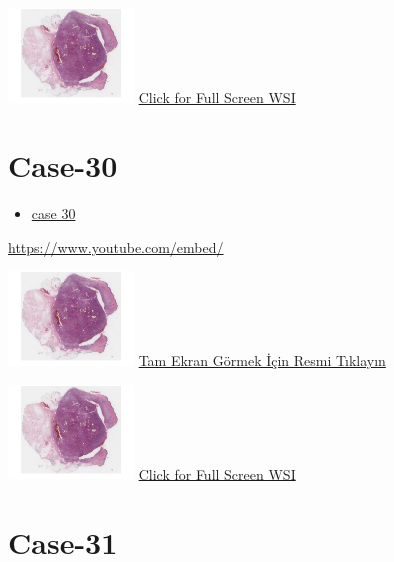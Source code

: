 \documentclass[
  letterpaper,
  paper=6in:9in,
  pagesize=pdftex,
  headinclude=on,
  footinclude=on,
  12pt]{scrbook}
\providecommand{\tightlist}{%
  \setlength{\itemsep}{0pt}\setlength{\parskip}{0pt}}\usepackage{longtable,booktabs,array}
\begin{document}
\href{https://images.patolojiatlasi.com/hacettepe-com-case-1/HE.html}{\includegraphics[width=0.25\textwidth,height=\textheight]{./screenshots/hacettepe-com-case-1_screenshot.png}}
\href{https://images.patolojiatlasi.com/hacettepe-com-case-/HE.html}{Click
for Full Screen WSI}

\hypertarget{sec-hacettepe-case-of-the-month-case-30}{%
\section{Case-30}\label{sec-hacettepe-case-of-the-month-case-30}}

\begin{itemize}
\tightlist
\item
  \href{https://www.youtube.com/watch?v=az6Fk7bYsQ8\&ab_channel=KemalKosemehmetoglu}{case
  30}
\end{itemize}

\url{https://www.youtube.com/embed/}

\href{https://images.patolojiatlasi.com/hacettepe-com-case-1/HE.html}{\includegraphics[width=0.25\textwidth,height=\textheight]{./screenshots/hacettepe-com-case-1_screenshot.png}}
\href{https://images.patolojiatlasi.com/hacettepe-com-case-/HE.html}{Tam
Ekran Görmek İçin Resmi Tıklayın}

\href{https://images.patolojiatlasi.com/hacettepe-com-case-1/HE.html}{\includegraphics[width=0.25\textwidth,height=\textheight]{./screenshots/hacettepe-com-case-1_screenshot.png}}
\href{https://images.patolojiatlasi.com/hacettepe-com-case-/HE.html}{Click
for Full Screen WSI}

\hypertarget{sec-hacettepe-case-of-the-month-case-31}{%
\section{Case-31}\label{sec-hacettepe-case-of-the-month-case-31}}
\end{document}

